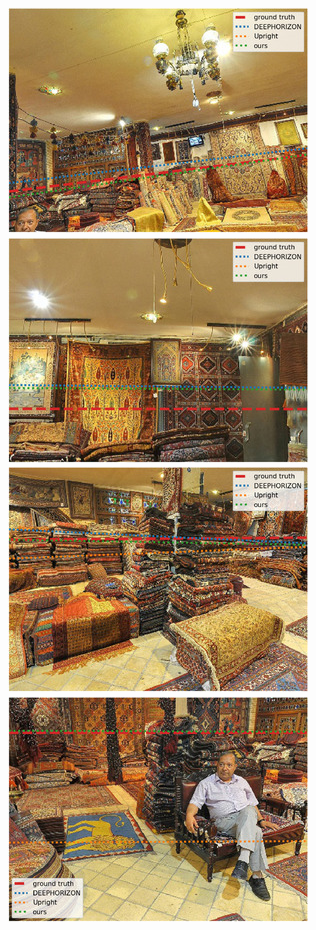 \includegraphics{horizon_estimation/thumb/pano_addjhelqxestdk-2.jpg}
\includegraphics{horizon_estimation/thumb/pano_addjhelqxestdk-3.jpg}
\includegraphics{horizon_estimation/thumb/pano_addjhelqxestdk-4.jpg}
\includegraphics{horizon_estimation/thumb/pano_addjhelqxestdk-6.jpg}
